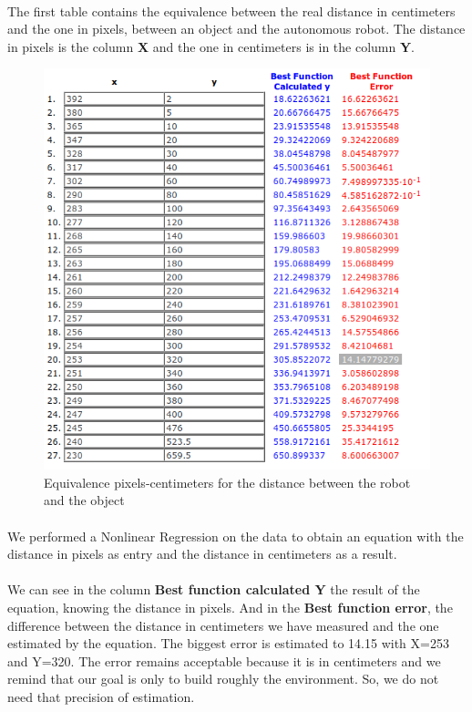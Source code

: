 \documentclass[12pt]{report}
\begin{document}
	\paragraph{}
	The first table contains the equivalence between the real distance in centimeters and the one in pixels, between an object and the autonomous robot. The distance in pixels is the column \textbf{X} and the one in centimeters is in the column \textbf{Y}.
	\begin{figure}[H]
		\begin{center}
			\includegraphics[scale=0.6]{res/reg2D.png}
			\caption{Equivalence pixels-centimeters for the distance between the robot and the object}
		\end{center}
	\end{figure}
\paragraph{}
We performed a Nonlinear Regression on the data to obtain an equation with the distance in pixels as entry and the distance in centimeters as a result.

\paragraph{}
We can see in the column \textbf{Best function calculated Y} the result of the equation, knowing the distance in pixels. And in the  \textbf{Best function error}, the difference between the distance in centimeters we have measured and the one estimated by the equation. The biggest error is estimated to 14.15 with X=253 and Y=320. The error remains acceptable because it is in centimeters and we remind that our goal is only to build roughly the environment. So, we do not need that precision of estimation.
\end{document}
